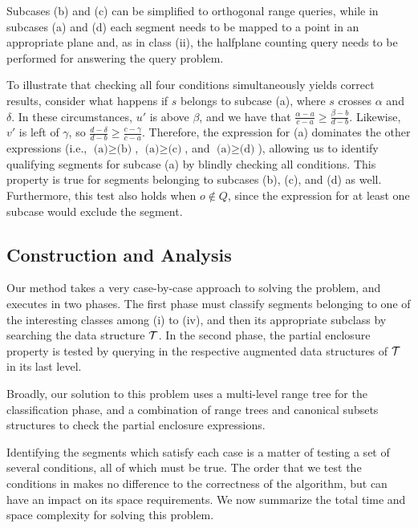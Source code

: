 Subcases (b) and (c) can be simplified to orthogonal range 
queries, while in subcases (a) and (d) each segment needs to be mapped to 
a point in an appropriate plane and, as in class 
(ii), the halfplane counting query needs to be performed for answering 
the query problem. 

To illustrate that checking all four conditions simultaneously 
yields correct results, consider what happens if $s$ belongs 
to subcase (a), where $s$ crosses $\alpha$ and $\delta$. In 
these circumstances, $u'$ is above $\beta$, and we have that 
$\frac{\alpha - a}{c - a} \geq \frac{\beta - b}{d - b}$.  
Likewise, $v'$ is left of $\gamma$, so $\frac{d - \delta}{d - b} 
\geq \frac{c - \gamma}{c - a}$.  Therefore, the expression for 
(a) dominates the other expressions (i.e., $\text{(a)} \geq 
\text{(b)}$, $\text{(a)} \geq \text{(c)}$, and $\text{(a)} \geq 
\text{(d)}$), allowing us to identify qualifying segments for 
subcase (a) by blindly checking all conditions. This property 
is true for segments belonging to subcases (b), (c), and (d) 
as well. Furthermore, this test also holds when $o \not \in Q$, 
since the expression for at least one subcase would exclude the 
segment.


\subsection{Construction and Analysis}
\label{:rectangles:ao:analysis}

Our method takes a very case-by-case approach to solving the problem, 
and executes in two phases. The first phase must classify segments 
belonging to one of the interesting classes among (i) to (iv), and then 
its appropriate subclass by searching the data structure $\cal T$.  
In the second phase, the partial enclosure property is tested by 
querying in the respective augmented data structures of $\cal T$ in 
its last level. 

Broadly, our solution to this problem uses a multi-level range tree 
\cite{Deberg} for the classification phase, and a combination of 
range trees and canonical subsets structures \cite{chan2012} to 
check the partial enclosure expressions. 

Identifying the segments which satisfy each case is a matter of 
testing a set of several conditions, all of which must be true. 
The order that we test the conditions in makes no difference to 
the correctness of the algorithm, but can have an impact on its 
space requirements. We now summarize the total time and space 
complexity for solving this problem. 

